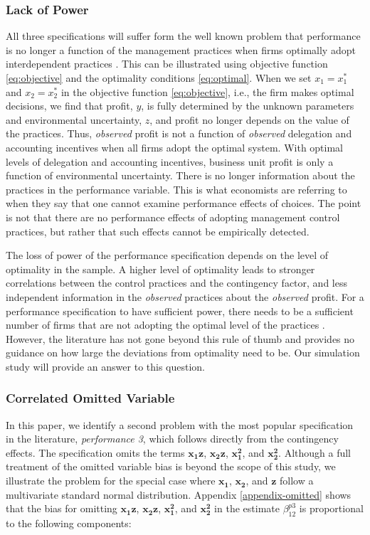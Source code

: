 \documentclass[12pt]{article}
\begin{document}
\subsubsection{Lack of Power}

All three specifications will suffer form the well known problem that performance is no longer a function of the management practices when firms optimally adopt interdependent practices \citep{grabner_management_2013}. This can be illustrated using objective function \eqref{eq:objective} and the optimality conditions \eqref{eq:optimal}. When we set $x_1 = x_1^*$ and $x_2 = x_2^*$ in the objective function  \eqref{eq:objective}, i.e., the firm makes optimal decisions, we find that profit, $y$, is fully determined by the unknown parameters and environmental uncertainty, $z$, and profit no longer depends on the value of the practices. Thus, \textit{observed} profit is not a function of \textit{observed} delegation and accounting incentives when all firms adopt the optimal system. With optimal levels of delegation and accounting incentives, business unit profit is only a function of environmental uncertainty. There is no longer information about the practices in the performance variable. This is what economists are referring to when they say that one cannot examine performance effects of choices. The point is not that there are no performance effects of adopting management control practices, but rather that such effects cannot be empirically detected. 

The loss of power of the performance specification depends on the level of optimality in the sample. A higher level of optimality leads to stronger  correlations between the control practices and the contingency factor, and less independent information in the \textit{observed} practices about the \textit{observed} profit. For a performance specification to have sufficient power, there needs to be a sufficient number of firms that are not adopting the optimal level of the practices \citep{bedford_management_2016, carree_note_2011, hofmann_organizational_2017}. However, the literature has not gone beyond this rule of thumb and provides no guidance on how large the deviations from optimality need to be. Our simulation study will provide an answer to this question.

\subsubsection{Correlated Omitted Variable}

In this paper, we identify a second problem with the most popular specification in the literature, \emph{performance 3}, which follows directly from the contingency effects. The specification omits the terms $\mathbf{x_1 z}$, $\mathbf{x_2 z}$, $\mathbf{x_1^2}$, and $\mathbf{x_2^2}$. Although a full treatment of the omitted variable bias is beyond the scope of this study, we illustrate the problem for the special case where $\mathbf{x_1}$, $\mathbf{x_2}$, and $\mathbf{z}$ follow a multivariate standard normal distribution. Appendix \ref{appendix-omitted} shows that the bias for omitting $\mathbf{x_1 z}$, $\mathbf{x_2 z}$, $\mathbf{x_1^2}$, and $\mathbf{x_2^2}$ in the estimate $\beta^{p3}_{12}$ is proportional to the following components:
\end{document}
